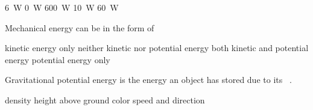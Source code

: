 \documentclass{exam}
\begin{document}
\begin{questions}
\begin{randomizeoneparchoices}
\choice \SI{6}{W}
\choice \SI{0}{W}
\correctchoice \SI{600}{W}
\choice \SI{10}{W}
\choice \SI{60}{W}
\end{randomizeoneparchoices}

\question
Mechanical energy can be in the form of

\begin{randomizechoices}
\choice kinetic energy only
\choice neither kinetic nor potential energy
\correctchoice both kinetic and potential energy
\choice potential energy only
\end{randomizechoices}

\question
Gravitational potential energy is the energy an object has stored due to its \fillin\ .

\begin{randomizeoneparchoices}
\choice density
\correctchoice height above ground
\choice color
\choice speed and direction
\end{randomizeoneparchoices}




\clearpage
\ifprintanswers
    \printkeytable
\fi


\end{questions}
\end{document}
